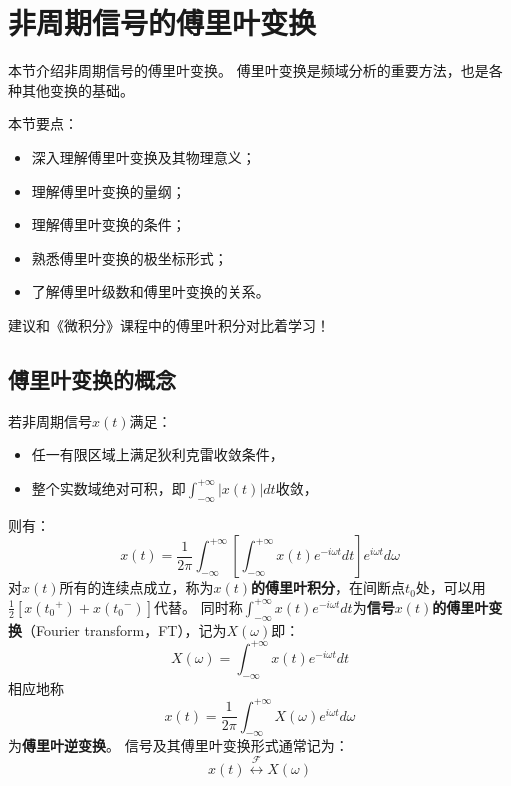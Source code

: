 \section{非周期信号的傅里叶变换}

本节介绍非周期信号的傅里叶变换。
傅里叶变换是频域分析的重要方法，也是各种其他变换的基础。

本节要点：
\begin{itemize}
    \item 深入理解傅里叶变换及其物理意义；
    \item 理解傅里叶变换的量纲；
    \item 理解傅里叶变换的条件；
    \item 熟悉傅里叶变换的极坐标形式；
    \item 了解傅里叶级数和傅里叶变换的关系。
\end{itemize}

\begin{tcolorbox}
建议和《微积分》课程中的傅里叶积分对比着学习！
\end{tcolorbox}

\subsection{傅里叶变换的概念}

\begin{definition}[傅里叶变换]
若非周期信号$x\left( t \right) $满足：
\begin{itemize}
    \item 任一有限区域上满足狄利克雷收敛条件，
    \item 整个实数域绝对可积，即$\int_{-\infty}^{+\infty}{\left| x\left( t \right) \right|dt}$收敛，
\end{itemize}
则有：
\[
x\left( t \right) =\frac{1}{2\pi}\int_{-\infty}^{+\infty}{\left[ \int_{-\infty}^{+\infty}{x\left( t \right) e^{-i\omega t}dt} \right] e^{i\omega t}d\omega}
\]
对$x\left( t \right) $所有的连续点成立，称为{\bf $x\left( t \right) $的傅里叶积分}，在间断点$t_0$处，可以用$\frac{1}{2}\left[ x\left( {t_0}^+ \right) +x\left( {t_0}^- \right) \right] $代替。
同时称$\int_{-\infty}^{+\infty}{x\left( t \right) e^{-i\omega t}dt}$为{\bf 信号$x\left( t \right) $的傅里叶变换}（Fourier transform，FT），记为$X\left( \omega \right) $即：
\[
X\left( \omega \right) =\int_{-\infty}^{+\infty}{x\left( t \right) e^{-i\omega t}dt}
\]
相应地称
\[
x\left( t \right) =\frac{1}{2\pi}\int_{-\infty}^{+\infty}{X\left( \omega \right) e^{i\omega t}d\omega}
\]
为{\bf 傅里叶逆变换}。
信号及其傅里叶变换形式通常记为：
\[
x\left( t \right) \overset{\mathscr{F}}{\leftrightarrow}X\left( \omega \right)
\]
\end{definition}

